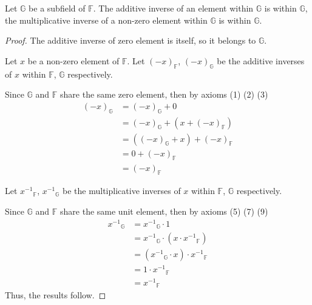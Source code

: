 \begin{theorem}\label{thm:inverse-elements-of-subfield}
    Let $\mathbb{G}$ be a subfield of $\mathbb{F}$. The additive inverse of an element within $\mathbb{G}$ is within $\mathbb{G}$, the multiplicative inverse of a non-zero element within $\mathbb{G}$ is within $\mathbb{G}$.
\end{theorem}

\begin{proof}
    The additive inverse of zero element is itself, so it belongs to $\mathbb{G}$.

    Let $x$ be a non-zero element of $\mathbb{F}$. Let ${(-x)}_{\mathbb{F}}$, ${(-x)}_{\mathbb{G}}$ be the additive inverses of $x$ within $\mathbb{F}$, $\mathbb{G}$ respectively.

    Since $\mathbb{G}$ and $\mathbb{F}$ share the same zero element, then by axioms (1) (2) (3)
    \begin{align*}
        {(-x)}_{\mathbb{G}} & = {(-x)}_{\mathbb{G}} + 0                         \\
                            & = {(-x)}_{\mathbb{G}} + (x + {(-x)}_{\mathbb{F}}) \\
                            & = ({(-x)}_{\mathbb{G}} + x) + {(-x)}_{\mathbb{F}} \\
                            & = 0 + {(-x)}_{\mathbb{F}}                         \\
                            & = {(-x)}_{\mathbb{F}}
    \end{align*}

    Let ${x^{-1}}_{\mathbb{F}}$, ${x^{-1}}_{\mathbb{G}}$ be the multiplicative inverses of $x$ within $\mathbb{F}$, $\mathbb{G}$ respectively.

    Since $\mathbb{G}$ and $\mathbb{F}$ share the same unit element, then by axioms (5) (7) (9)
    \begin{align*}
        {x^{-1}}_{\mathbb{G}} & = {x^{-1}}_{\mathbb{G}}\cdot 1                              \\
                              & = {x^{-1}}_{\mathbb{G}}\cdot (x\cdot {x^{-1}}_{\mathbb{F}}) \\
                              & = ({x^{-1}}_{\mathbb{G}}\cdot x)\cdot {x^{-1}}_{\mathbb{F}} \\
                              & = 1\cdot {x^{-1}}_{\mathbb{F}}                              \\
                              & = {x^{-1}}_{\mathbb{F}}
    \end{align*}
    Thus, the results follow.
\end{proof}

